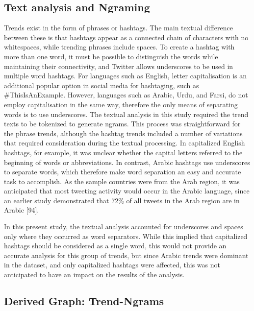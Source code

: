 \documentclass[conference]{IEEEtran}
\begin{document}


\subsection{Text analysis and Ngraming}
Trends exist in the form of phrases or hashtags. The main textual 
difference between these is that hashtags appear as a connected 
chain of characters with no whitespaces, while trending phrases include 
spaces. To create a hashtag with more than one word, it must be possible 
to distinguish the words while maintaining their connectivity, and Twitter 
allows underscores to be used in multiple word hashtags. For languages 
such as English, letter capitalisation is an additional popular option in social 
media for hashtaging, such as \#ThisIsAnExample. However, languages 
such as Arabic, Urdu, and Farsi, do not employ capitalisation in the same 
way, therefore the only means of separating words is to use underscores. 
The textual analysis in this study required the trend texts to be tokenized 
to generate ngrams. This process was straightforward for the phrase trends, 
although the hashtag trends included a number of variations that required 
consideration during the textual processing. In capitalized English hashtags, 
for example, it was unclear whether the capital letters referred to the 
beginning of words or abbreviations. In contrast, Arabic hashtags use 
underscores to separate words, which therefore make word separation an 
easy and accurate task to accomplish. As the sample countries were from the 
Arab region, it was anticipated that most tweeting activity would occur in the 
Arabic language, since an earlier study demonstrated that 72\% of all tweets 
in the Arab region are in Arabic [94]. 

In this present study, the textual analysis accounted for underscores and spaces 
only where they occurred as word separators. While this implied that capitalized 
hashtags should be considered as a single word, this would not provide an accurate 
analysis for this group of trends, but since Arabic trends were dominant in the dataset, 
and only capitalized hashtags were affected, this was not anticipated to have an impact 
on the results of the analysis.


\subsection{Derived Graph: Trend-Ngrams}
\end{document}
